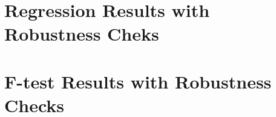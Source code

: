 \restoregeometry

\newpage
\section{Regression Results with Robustness Cheks}
%
\label{tab:newey1}
\label{tab:overlap1}
\label{tab:overlap2}

\newpage
\section{F-test Results with Robustness Checks}
%
\label{tab:ftest1}
\label{tab:ftest2}
\label{tab:ftestOverlap1}
\label{tab:ftestOverlap2}




